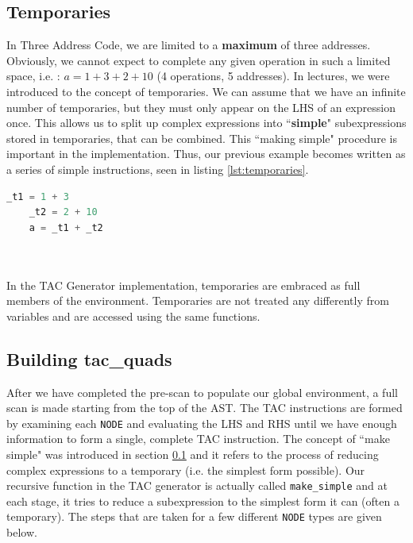 \subsection{Temporaries} \label{sec:temporaries}
In Three Address Code, we are limited to a \textbf{maximum} of three addresses. Obviously, we cannot expect to complete any given operation in such a limited space, i.e. : $a = 1 + 3 + 2 + 10$ (4 operations, 5 addresses). In lectures, we were introduced to the concept of temporaries. We can assume that we have an infinite number of temporaries, but they must only appear on the LHS of an expression once. This allows us to split up complex expressions into ``\textbf{simple}" subexpressions stored in temporaries, that can be combined. This ``making simple" procedure is important in the implementation. Thus, our previous example becomes written as a series of simple instructions, seen in listing \ref{lst:temporaries}.
\ \\
\begin{lstlisting}[showstringspaces=false,language=java,breaklines=true, backgroundcolor=\color{light-gray}, captionpos=b, label={lst:temporaries}, caption={Using Temporaries}]
	_t1 = 1 + 3
	_t2 = 2 + 10
	a = _t1 + _t2
\end{lstlisting}
\ \\ \ \\
In the TAC Generator implementation, temporaries are embraced as full members of the environment. Temporaries are not treated any differently from variables and are accessed using the same functions. 

\subsection{Building tac\_quads}
After we have completed the pre-scan to populate our global environment, a full scan is made starting from the top of the AST. The TAC instructions are formed by examining each \verb!NODE! and evaluating the LHS and RHS until we have enough information to form a single, complete TAC instruction. The concept of ``make simple" was introduced in section \ref{sec:temporaries} and it refers to the process of reducing complex expressions to a temporary (i.e. the simplest form possible). Our recursive function in the TAC generator is actually called \verb!make_simple! and at each stage, it tries to reduce a subexpression to the simplest form it can (often a temporary). The steps that are taken for a few different \verb!NODE! types are given below.

